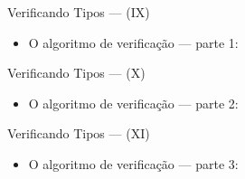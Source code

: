 \documentclass{beamer}
\begin{document}
       \begin{frame}{Verificando Tipos --- (IX)}
         \begin{itemize}
           \item O algoritmo de verifica\c{c}\~ao --- parte 1:
         \end{itemize}
       \end{frame}

       \begin{frame}{Verificando Tipos --- (X)}
         \begin{itemize}
           \item O algoritmo de verifica\c{c}\~ao --- parte 2:
         \end{itemize}
       \end{frame}


        \begin{frame}{Verificando Tipos --- (XI)}
         \begin{itemize}
           \item O algoritmo de verifica\c{c}\~ao --- parte 3:
         \end{itemize}
         \begin{flushleft}
         \end{flushleft}
       \end{frame}
\end{document}
